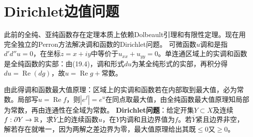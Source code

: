 \section{Dirichlet边值问题}
此前的全纯、亚纯函数存在定理本质上依赖Dolbeault引理和有限性定理。现在用完全独立的Perron方法解决调和函数的Dirichlet问题。
可微函数$u$调和是指$d'd''u=0$，在坐标$z=x+iy$中等价于$u_{xx}+u_{yy}=0$。单连通区域上的实调和函数是全纯函数的实部：由(19.4)，调和形式$du$为某全纯形式的实部，再积分得$du=\operatorname{Re}(dg)$，故$u=\operatorname{Re}g+\text{常数}$。

由此得调和函数最大值原理：区域上的实调和函数若在内部取到最大值，必为常数。局部写$u=\operatorname{Re}f$，则$|e^f|=e^u$在同点取最大值，由全纯函数最大值原理知局部为常数，再由连通性在全域为常数。
\textbf{Dirichlet问题}：给定开集$Y\subset X$及连续$f:\partial Y\to\mathbb R$，求$\overline Y$上的连续函数$u$，在$Y$内调和且边界值为$f$。若$\overline Y$紧且边界非空，解若存在就唯一，因为两解之差边界为零，最大值原理给出其既$\le0$又$\ge0$。

